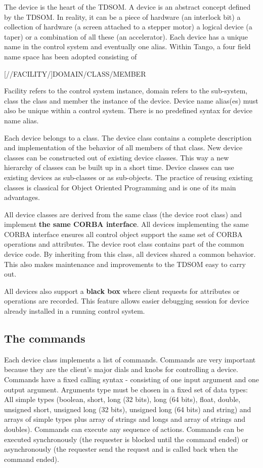 The device is the heart of the TDSOM. A device is an abstract concept
defined by the TDSOM. In reality, it can be a piece of hardware (an
interlock bit) a collection of hardware (a screen attached to a stepper
motor) a logical device (a taper) or a combination of all these (an
accelerator). Each device has a unique name in the control system
and eventually one alias. Within Tango, a four field
name space has been adopted consisting of \begin{center}{[}//FACILITY/{]}DOMAIN/CLASS/MEMBER\end{center}
Facility refers to the control system instance, domain refers to the
sub-system, class the class and member the instance of the device.
Device name alias(es) must also be unique within a control system.
There is no predefined syntax for device name alias.

Each device belongs to a class. The device class contains a complete
description and implementation of the behavior of all members of that
class. New device classes can be constructed out of existing device
classes. This way a new hierarchy of classes can be built up in a
short time. Device classes can use existing devices as sub-classes
or as sub-objects. The practice of reusing existing classes is classical
for Object Oriented Programming and is one of its main advantages.

All device classes are derived from the same class (the device root
class) and implement \textbf{the same CORBA interface}. All devices
implementing the same CORBA interface ensures all control object support
the same set of CORBA operations and attributes. The device root class
contains part of the common device code. By inheriting from this class,
all devices shared a common behavior. This also makes maintenance
and improvements to the TDSOM easy to carry out.

All devices also support a \textbf{black box} where
client requests for attributes or operations are recorded. This feature
allows easier debugging session for device already installed in a
running control system.


\subsection{The commands}

Each device class implements a list of commands. Commands are very
important because they are the client's major dials and knobs for
controlling a device. Commands have a fixed calling syntax - consisting
of one input argument and one output argument. Arguments type must
be chosen in a fixed set of data types: All simple types (boolean,
short, long (32 bits), long (64 bits), float, double, unsigned short,
unsigned long (32 bits), unsigned long (64 bits) and string) and arrays
of simple types plus array of strings and longs and array of strings
and doubles). Commands can execute any sequence of actions. Commands
can be executed synchronously (the requester is blocked until the
command ended) or asynchronously (the requester send the request and
is called back when the command ended).

